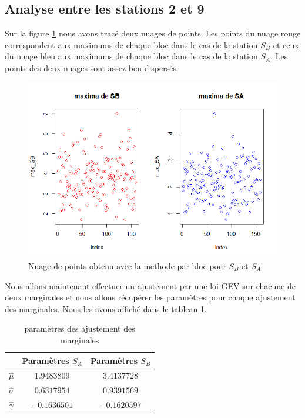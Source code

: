 \documentclass[a4paper,french,10pt]{article}
\begin{document}
\subsection{Analyse entre les stations 2 et 9}

Sur la figure \ref{max_SB_SA} nous avons tracé deux nuages de points. Les points du nuage rouge correspondent aux maximums de chaque bloc dans le cas de la station $S_B$ et ceux du nuage bleu aux maximums de chaque bloc dans le cas de la station $S_A$. Les points des deux nuages sont assez ben dispersés.
\begin{figure}[htp] 
	\centering
	\includegraphics[scale=0.45]{images/max_SB_SA.png}
	\caption{Nuage de points obtenu avec la methode par bloc pour $S_B$ et $S_A$}
	\label{max_SB_SA}
\end{figure}

Nous allons maintenant effectuer un ajustement par une loi GEV sur chacune de deux marginales et nous allons récupérer les paramètres pour chaque ajustement des marginales. Nous les avons affiché dans le tableau \ref{param}.

\begin{table}[htp]
	\center
	\begin{tabular}{|c||c|c|}
		\hline
		 & Paramètres $S_A$ & Paramètres $S_B$\\
		\hline
		$\widehat{\mu}$ & $1.9483809$ & $3.4137728$ \\
		\hline
		$\widehat{\sigma}$ & $0.6317954$ & $0.9391569$ \\
		\hline
		$\widehat{\gamma}$ & $-0.1636501$ & $-0.1620597$ \\
		\hline
	\end{tabular}
	\caption{paramètres des ajustement des marginales}
	\label{param}
\end{table}
\end{document}
